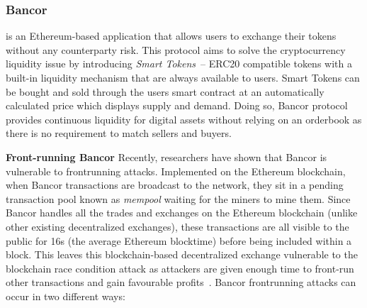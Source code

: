 




\subsubsection{Bancor} is an Ethereum-based application that allows users to exchange their tokens without any counterparty risk. This protocol aims to solve the cryptocurrency liquidity issue by introducing \textit{Smart Tokens}~\cite{hertzog2017bancor}-- ERC20 compatible tokens with a built-in liquidity mechanism that are always available to users. Smart Tokens can be bought and sold through the users smart contract at an automatically calculated price which displays supply and demand. Doing so, Bancor protocol provides continuous liquidity for digital assets without relying on an orderbook as there is no requirement to match sellers and buyers.

\par\noindent\textbf{Front-running Bancor} Recently, researchers have shown that Bancor is vulnerable to frontrunning attacks. Implemented on the Ethereum blockchain, when Bancor transactions are broadcast to the network, they sit in a pending transaction pool known as \textit{mempool} waiting for the miners to mine them. Since Bancor handles all the trades and exchanges on the Ethereum blockchain (unlike other existing decentralized exchanges), these transactions are all visible to the public for 16s (the average Ethereum blocktime) before being included within a block. This leaves this blockchain-based decentralized exchange vulnerable to the blockchain race condition attack as attackers are given enough time to front-run other transactions and gain favourable profits~\cite{BancorIs7:online}. Bancor frontrunning attacks can occur in two different ways:


